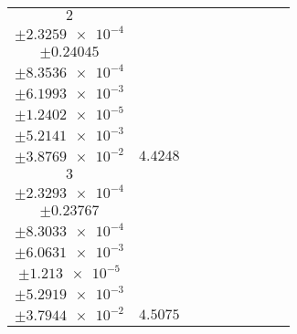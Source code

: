 \documentclass[8pt]{article}
\begin{document}
\begin{longtable}[l]{c c c c c c c c c}
$\num{2}$ & \begin{tabular}[c]{@{}c@{}}$\num{5.5525e-2}$ \\ $\pm\num{2.3259e-4}$\end{tabular} & \begin{tabular}[c]{@{}c@{}}$\num{5.8755e-2}$ \\ $\pm\num{0.24045}$\end{tabular} & \begin{tabular}[c]{@{}c@{}}$\num{-3.8348}$ \\ $\pm\num{8.3536e-4}$\end{tabular} & \begin{tabular}[c]{@{}c@{}}$\num{2.0275e+3}$ \\ $\pm\num{6.1993e-3}$\end{tabular} & \begin{tabular}[c]{@{}c@{}}$\num{4.056}$ \\ $\pm\num{1.2402e-5}$\end{tabular} & \begin{tabular}[c]{@{}c@{}}$\num{1.1699}$ \\ $\pm\num{5.2141e-3}$\end{tabular} & \begin{tabular}[c]{@{}c@{}}$\num{4.2431}$ \\ $\pm\num{3.8769e-2}$\end{tabular} & $\num{4.4248}$\\
$\num{3}$ & \begin{tabular}[c]{@{}c@{}}$\num{5.6538e-2}$ \\ $\pm\num{2.3293e-4}$\end{tabular} & \begin{tabular}[c]{@{}c@{}}$\num{1.8776e-2}$ \\ $\pm\num{0.23767}$\end{tabular} & \begin{tabular}[c]{@{}c@{}}$\num{3.835}$ \\ $\pm\num{8.3033e-4}$\end{tabular} & \begin{tabular}[c]{@{}c@{}}$\num{2.0351e+3}$ \\ $\pm\num{6.0631e-3}$\end{tabular} & \begin{tabular}[c]{@{}c@{}}$\num{4.0714}$ \\ $\pm\num{1.213e-5}$\end{tabular} & \begin{tabular}[c]{@{}c@{}}$\num{1.2015}$ \\ $\pm\num{5.2919e-3}$\end{tabular} & \begin{tabular}[c]{@{}c@{}}$\num{4.0823}$ \\ $\pm\num{3.7944e-2}$\end{tabular} & $\num{4.5075}$\\

\end{longtable}
\end{document}
